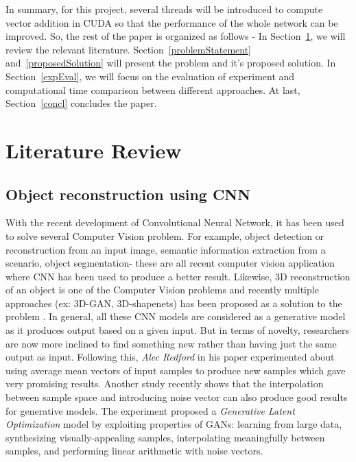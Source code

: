 \documentclass[11pt]{article}       %
\begin{document}
In summary, for this project, several threads will be introduced to compute vector addition in CUDA so that the performance of the whole network can be improved. So, the rest of the paper is organized as follows - In Section~\ref{litrev}, we will review the relevant literature. Section~\ref{problemStatement} and~\ref{proposedSolution} will present the problem and it's proposed solution. In Section~\ref{expEval}, we will focus on the evaluation of experiment and computational time comparison between different approaches. At last, Section~\ref{concl} concludes the paper.


\section{Literature Review} \label{litrev}
\subsection{Object reconstruction using CNN} \label{subrev1}
With the recent development of Convolutional Neural Network, it has been used to solve several Computer Vision problem. For example, object detection or reconstruction from an input image, semantic information extraction from a scenario, object segmentation- these are all recent computer vision application where CNN has been used to produce a better result. Likewise, 3D reconstruction of an object is one of the Computer Vision problems and recently multiple approaches (ex: 3D-GAN, 3D-shapenets) has been proposed as a solution to the problem \cite{dr1}. In general, all these CNN models are considered as a generative model as it produces output based on a given input. But in terms of novelty, researchers are now more inclined to find something new rather than having just the same output as input. Following this, \textit{Alec Redford} in his paper \cite{radford2015unsupervised} experimented about using average mean vectors of input samples to produce new samples which gave very promising results. Another study recently shows that the interpolation between sample space and introducing noise vector can also produce good results for generative models. The experiment proposed a \textit{Generative Latent Optimization} model by exploiting properties of GANs: learning from large data, synthesizing visually-appealing samples, interpolating meaningfully between
samples, and performing linear arithmetic with noise vectors\cite{bojanowski2017optimizing}.\newline
\end{document}
